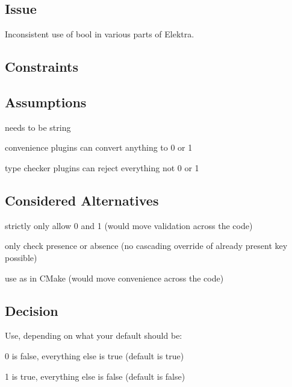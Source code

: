 \subsection*{Issue}

Inconsistent use of bool in various parts of Elektra.

\subsection*{Constraints}

\subsection*{Assumptions}


\begin{DoxyItemize}
\item needs to be string
\item convenience plugins can convert anything to 0 or 1
\item type checker plugins can reject everything not 0 or 1
\end{DoxyItemize}

\subsection*{Considered Alternatives}


\begin{DoxyItemize}
\item strictly only allow 0 and 1 (would move validation across the code)
\item only check presence or absence (no cascading override of already present key possible)
\item use as in C\+Make (would move convenience across the code)
\end{DoxyItemize}

\subsection*{Decision}

Use, depending on what your default should be\+:


\begin{DoxyItemize}
\item 0 is false, everything else is true (default is true)
\item 1 is true, everything else is false (default is false)
\end{DoxyItemize}

